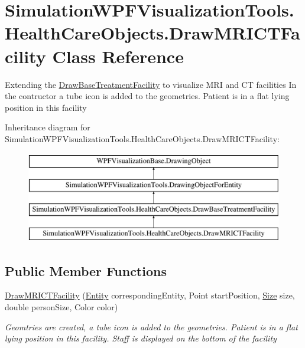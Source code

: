 \hypertarget{class_simulation_w_p_f_visualization_tools_1_1_health_care_objects_1_1_draw_m_r_i_c_t_facility}{}\section{Simulation\+W\+P\+F\+Visualization\+Tools.\+Health\+Care\+Objects.\+Draw\+M\+R\+I\+C\+T\+Facility Class Reference}
\label{class_simulation_w_p_f_visualization_tools_1_1_health_care_objects_1_1_draw_m_r_i_c_t_facility}


Extending the \hyperlink{class_simulation_w_p_f_visualization_tools_1_1_health_care_objects_1_1_draw_base_treatment_facility}{Draw\+Base\+Treatment\+Facility} to visualize M\+RI and CT facilities In the contructor a tube icon is added to the geometries. Patient is in a flat lying position in this facility  


Inheritance diagram for Simulation\+W\+P\+F\+Visualization\+Tools.\+Health\+Care\+Objects.\+Draw\+M\+R\+I\+C\+T\+Facility\+:\begin{figure}[H]
\begin{center}
\leavevmode
\includegraphics[height=4.000000cm]{class_simulation_w_p_f_visualization_tools_1_1_health_care_objects_1_1_draw_m_r_i_c_t_facility}
\end{center}
\end{figure}
\subsection*{Public Member Functions}
\begin{DoxyCompactItemize}
\item 
\hyperlink{class_simulation_w_p_f_visualization_tools_1_1_health_care_objects_1_1_draw_m_r_i_c_t_facility_abcbf61bd78dcdaf19aead56f79c635a8}{Draw\+M\+R\+I\+C\+T\+Facility} (\hyperlink{class_simulation_core_1_1_h_c_c_m_elements_1_1_entity}{Entity} corresponding\+Entity, Point start\+Position, \hyperlink{class_simulation_w_p_f_visualization_tools_1_1_health_care_objects_1_1_draw_base_treatment_facility_a83f48a13fa5f4f714e22088818f2038a}{Size} size, double person\+Size, Color color)
\begin{DoxyCompactList}\small\item\em Geomtries are created, a tube icon is added to the geometries. Patient is in a flat lying position in this facility. Staff is displayed on the bottom of the facility \end{DoxyCompactList}\end{DoxyCompactItemize}
